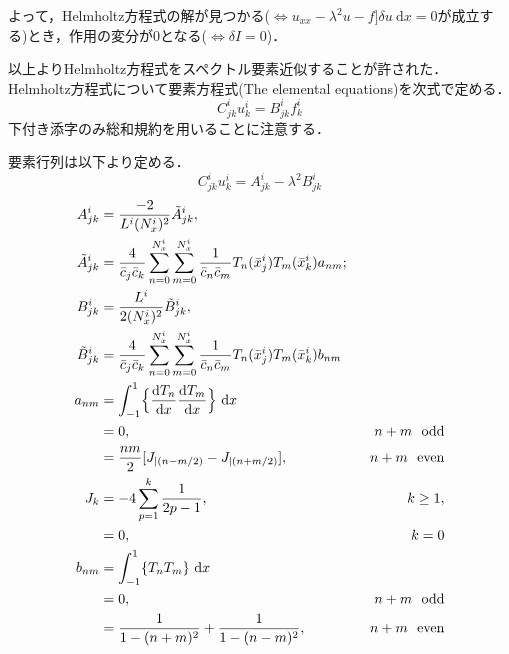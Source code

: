 \documentclass[12pt,a4paper]{jsarticle}
\begin{document}
よって，Helmholtz方程式の解が見つかる($\Longleftrightarrow u_{xx} -\lambda^2 u -f \Bigr] \delta u ~\mathrm{d} x = 0$が成立する)とき，作用の変分が0となる($\Longleftrightarrow \delta I = 0$)．

以上よりHelmholtz方程式をスペクトル要素近似することが許された．\\

Helmholtz方程式について要素方程式(The elemental equations)を次式で定める．
\begin{equation}
  C_{jk}^i u_{k}^i = B_{jk}^i f_{k}^i
  \label{eq:DefofElementalEquation}
\end{equation}
下付き添字のみ総和規約を用いることに注意する．

要素行列は以下より定める．
\begin{equation}
  C_{jk}^i u_{k}^i = A_{jk}^i -\lambda^2 B_{jk}^i
  \label{eq:DefofCjk}
\end{equation}
\begin{align}
  A_{jk}^i &= \frac{-2}{L^i (N_{x}^i)^2} \tilde{A}_{jk}^i, \\
  \tilde{A}_{jk}^i &= \frac{4}{\bar{c}_{j}\bar{c}_{k}} \sum_{n=0}^{N_{x}^i} \sum_{m=0}^{N_{x}^i} \frac{1}{\bar{c}_{n}\bar{c}_{m}} T_{n}(\bar{x}_j^i) T_{m}(\bar{x}_k^i) a_{nm}; \\
  B_{jk}^i &= \frac{L^i}{2 (N_{x}^i)^2} \tilde{B}_{jk}^i, \\
  \tilde{B}_{jk}^i &= \frac{4}{\bar{c}_{j}\bar{c}_{k}} \sum_{n=0}^{N_{x}^i} \sum_{m=0}^{N_{x}^i} \frac{1}{\bar{c}_{n}\bar{c}_{m}} T_{n}(\bar{x}_j^i) T_{m}(\bar{x}_k^i) b_{nm}
  \label{eq:DefofAjkBjk} \\
  a_{nm} &= \int_{-1}^{1} \Bigl\{ \frac{\mathrm{d} T_{n}}{\mathrm{d} x} \frac{\mathrm{d} T_{m}}{\mathrm{d} x} \Bigr\} ~\mathrm{d}x \nonumber \\
  &= 0, &~~n+m ~~\mathrm{odd}\\
  &= \frac{nm}{2} [J_{|(n-m/2)}-J_{|(n+m/2)}], &~~n+m ~~\mathrm{even}
  \label{eq:Defofanm} \\
  J_{k} &= -4 \sum_{p=1}^k \frac{1}{2p-1}, &k \ge 1, \\
        &= 0, &k = 0
  \label{eq:DefofJk} \\
  b_{nm} &= \int_{-1}^{1} \{ T_n T_m \} ~\mathrm{d}x \nonumber \\
  &= 0, &~~n+m ~~\mathrm{odd}\\
  &= \frac{1}{1-(n+m)^2} +\frac{1}{1-(n-m)^2}, &~~n+m ~~\mathrm{even}
  \label{eq:Defofanm}
\end{align}\\
\end{document}
